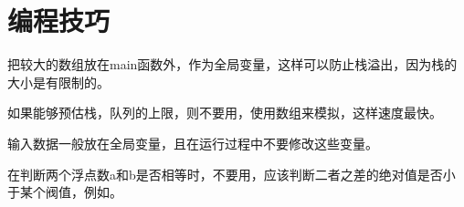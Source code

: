 \chapter{编程技巧}
把较大的数组放在main函数外，作为全局变量，这样可以防止栈溢出，因为栈的大小是有限制的。

如果能够预估栈，队列的上限，则不要用，使用数组来模拟，这样速度最快。

输入数据一般放在全局变量，且在运行过程中不要修改这些变量。

在判断两个浮点数a和b是否相等时，不要用，应该判断二者之差的绝对值是否小于某个阀值，例如。


